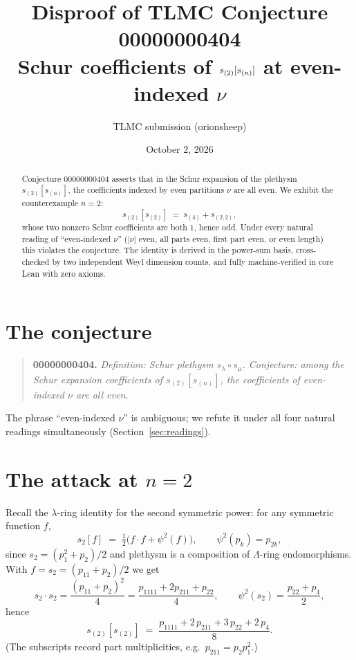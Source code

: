 \documentclass[11pt]{article}
\title{Disproof of TLMC Conjecture 00000000404\\
\large Schur coefficients of $\s{(2)}[\s{(n)}]$ at even-indexed $\nu$}
\author{TLMC submission (orionsheep)}
\date{October 2, 2026}
\newcommand{\s}[1]{s_{#1}}
\theoremstyle{plain}
\begin{document}
\maketitle

\begin{abstract}
Conjecture 00000000404 asserts that in the Schur expansion of the plethysm
$\s{(2)}[\s{(n)}]$, the coefficients indexed by even partitions $\nu$ are all
even.  We exhibit the counterexample $n=2$:
\[
\s{(2)}[\s{(2)}] \;=\; \s{(4)} + \s{(2,2)},
\]
whose two nonzero Schur coefficients are both $1$, hence odd.  Under every
natural reading of ``even-indexed $\nu$'' ($|\nu|$ even, all parts even,
first part even, or even length) this violates the conjecture.  The identity
is derived in the power-sum basis, cross-checked by two independent Weyl
dimension counts, and fully machine-verified in core Lean with zero axioms.
\end{abstract}

\section{The conjecture}

\begin{quote}
\textbf{00000000404.} \emph{Definition: Schur plethysm $\s\lambda \circ \s\mu$.
Conjecture: among the Schur expansion coefficients of $\s{(2)}[\s{(n)}]$, the
coefficients of even-indexed $\nu$ are all even.}
\end{quote}

The phrase ``even-indexed $\nu$'' is ambiguous; we refute it under all four
natural readings simultaneously (Section~\ref{sec:readings}).

\section{The attack at $n=2$}

Recall the $\lambda$-ring identity for the second symmetric power: for any
symmetric function $f$,
\[
\s{2}[f] \;=\; \tfrac{1}{2}\bigl(f\cdot f + \psi^2(f)\bigr),
\qquad \psi^2(p_k) = p_{2k},
\]
since $\s{2} = (p_1^2 + p_2)/2$ and plethysm is a composition of
$\Lambda$-ring endomorphisms.  With $f = \s{2} = (p_{11} + p_2)/2$ we get
\[
\s{2}\cdot\s{2} = \frac{(p_{11}+p_2)^2}{4}
 = \frac{p_{1111} + 2p_{211} + p_{22}}{4},
 \qquad
 \psi^2(\s{2}) = \frac{p_{22}+p_4}{2},
\]
hence
\begin{equation}\label{eq:pbasis}
\s{(2)}[\s{(2)}] \;=\; \frac{p_{1111} + 2\,p_{211} + 3\,p_{22} + 2\,p_4}{8}.
\end{equation}
(The subscripts record part multiplicities, e.g.\ $p_{211} = p_2p_1^2$.)
\end{document}
